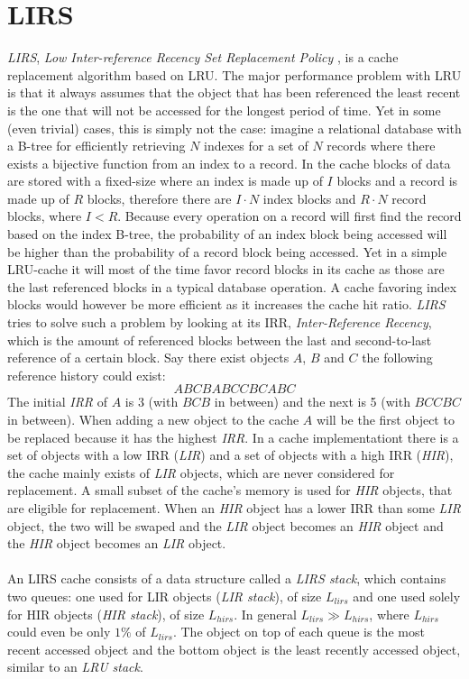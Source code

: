 \documentclass[pdftex,a4paper,12pt,twoside]{report}
\begin{document}
\section{LIRS}
\emph{LIRS}, \emph{Low Inter-reference Recency Set Replacement Policy} \citep{jiang2002lirs}, is a cache replacement algorithm based on LRU. 
The major performance problem with LRU is that it always assumes that the object that has been referenced the least recent is the one that will not be accessed for the longest period of time. Yet in some (even trivial) cases, this is simply not the case: imagine a relational database with a B-tree for efficiently retrieving $N$ indexes for a set of $N$ records where there exists a bijective function from an index to a record. In the cache blocks of data are stored with a fixed-size where an index is made up of $I$ blocks and a record is made up of $R$ blocks, therefore there are $I \cdot N$ index blocks and $R \cdot N$ record blocks, where $I < R$. Because every operation on a record will first find the record based on the index B-tree, the probability of an index block being accessed will be higher than the probability of a record block being accessed. Yet in a simple LRU-cache it will most of the time favor record blocks in its cache as those are the last referenced blocks in a typical database operation. A cache favoring index blocks would however be more efficient as it increases the cache hit ratio. \emph{LIRS} tries to solve such a problem by looking at its IRR, \emph{Inter-Reference Recency}, which is the amount of referenced blocks between the last and second-to-last reference of a certain block. Say there exist objects $A$, $B$ and $C$ the following reference history could exist:
\[ABCBABCCBCABC\]
The initial \emph{IRR} of $A$ is 3 (with $BCB$ in between) and the next is 5 (with $BCCBC$ in between). When adding a new object to the cache $A$ will be the first object to be replaced because it has the highest \emph{IRR}. In a cache implementationt there is a set of objects with a low IRR (\emph{LIR}) and a set of objects with a high IRR (\emph{HIR}), the cache mainly exists of \emph{LIR} objects, which are never considered for replacement. A small subset of the cache's memory is used for \emph{HIR} objects, that are eligible for replacement. When an \emph{HIR} object has a lower IRR than some \emph{LIR} object, the two will be swaped and the \emph{LIR} object becomes an \emph{HIR} object and the \emph{HIR} object becomes an \emph{LIR} object.
\\\\
An LIRS cache consists of a data structure called a \emph{LIRS stack}, which contains two queues: one used for LIR objects (\emph{LIR stack}), of size $L_{lirs}$ and one used solely for HIR objects (\emph{HIR stack}), of size $L_{hirs}$. In general $L_{lirs} \gg L_{hirs}$, where $L_{hirs}$ could even be only $1\%$ of $L_{lirs}$. The object on top of each queue is the most recent accessed object and the bottom object is the least recently accessed object, similar to an \emph{LRU stack}.
\end{document}
